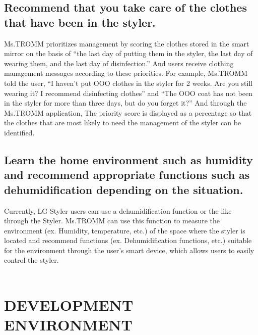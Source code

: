 \documentclass[conference]{IEEEtran}
\begin{document}
\subsection{Recommend that you take care of the clothes that have been in the styler.}
Ms.TROMM prioritizes management by scoring the clothes stored in the smart mirror on the basis of “the last day of putting them in the styler, the last day of wearing them, and the last day of disinfection.” And users receive clothing management messages according to these priorities. For example, Ms.TROMM told the user, “I haven’t put OOO clothes in the styler for 2 weeks. Are you still wearing it? I recommend disinfecting clothes” and “The OOO coat has not been in the styler for more than three days, but do you forget it?” And through the Ms.TROMM application, The priority score is displayed as a percentage so that the clothes that are most likely to need the management of the styler can be identified.\\


\subsection{Learn the home environment such as humidity and recommend appropriate functions such as dehumidification depending on the situation.}
Currently, LG Styler users can use a dehumidification function or the like through the Styler. Ms.TROMM can use this function to measure the environment (ex. Humidity, temperature, etc.) of the space where the styler is located and recommend functions (ex. Dehumidification functions, etc.) suitable for the environment through the user’s smart device, which allows users to easily control the styler.\\\\

\section{DEVELOPMENT ENVIRONMENT }
\end{document}
